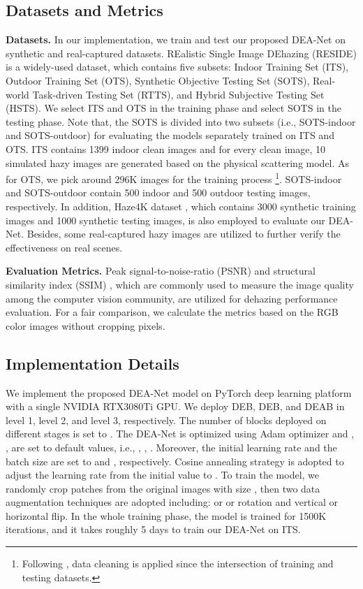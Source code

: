 \documentclass[lettersize,journal]{IEEEtran}
\begin{document}
\subsection{Datasets and Metrics}
\textbf{Datasets.} In our implementation, we train and test our proposed DEA-Net on synthetic and real-captured datasets. 
REalistic Single Image DEhazing (RESIDE) \cite{li2018TIP} is a widely-used dataset, which contains five subsets: Indoor Training Set (ITS), Outdoor Training Set (OTS), Synthetic Objective Testing Set (SOTS), Real-world Task-driven Testing Set (RTTS), and Hybrid Subjective Testing Set (HSTS).
We select ITS and OTS in the training phase and select SOTS in the testing phase.
Note that, the SOTS is divided into two subsets (i.e., SOTS-indoor and SOTS-outdoor) for evaluating the models separately trained on ITS and OTS.
ITS contains 1399 indoor clean images and for every clean image, 10 simulated hazy images are generated based on the physical scattering model.
As for OTS, we pick around 296K images for the training process \footnote{Following \cite{liu2019ICCV}, data cleaning is applied since the intersection of training and testing datasets.}.
SOTS-indoor and SOTS-outdoor contain 500 indoor and 500 outdoor testing images, respectively.
In addition, Haze4K dataset \cite{liu2021ACMMM}, which contains 3000 synthetic training images and 1000 synthetic testing images, is also employed to evaluate our DEA-Net.
Besides, some real-captured hazy images are utilized to further verify the effectiveness on real scenes.


\textbf{Evaluation Metrics.} Peak signal-to-noise-ratio (PSNR) and structural similarity index (SSIM) \cite{Wang2004TIP-SSIM}, which are commonly used to measure the image quality among the computer vision community, are utilized for dehazing performance evaluation.
For a fair comparison, we calculate the metrics based on the RGB color images without cropping pixels.

\subsection{Implementation Details}
We implement the proposed DEA-Net model on PyTorch deep learning platform with a single NVIDIA RTX3080Ti GPU.
We deploy DEB, DEB, and DEAB in level 1, level 2, and level 3, respectively.
The number of blocks deployed on different stages  is set to .
The DEA-Net is optimized using Adam \cite{Kingma2015ICLR-Adam} optimizer and , ,  are set to default values, i.e., , , .
Moreover, the initial learning rate and the batch size are set to  and , respectively.
Cosine annealing strategy \cite{He2019CVPR-Bag} is adopted to adjust the learning rate from the initial value to .
To train the model, we randomly crop patches from the original images with size , then 
two data augmentation techniques are adopted including:  or  or  rotation and vertical or horizontal flip.
In the whole training phase, the model is trained for 1500K iterations, and it takes roughly 5 days to train our DEA-Net on ITS.
\end{document}
